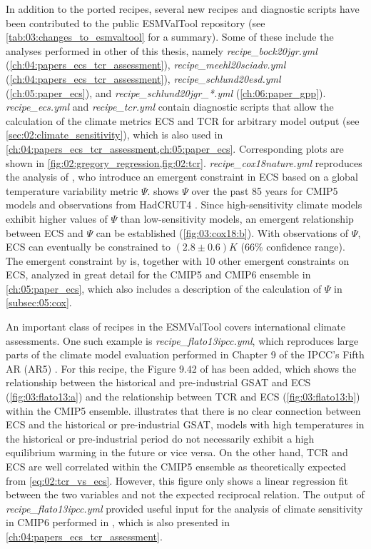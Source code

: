 In addition to the ported recipes, several new recipes and diagnostic scripts
have been contributed to the public \ac{ESMValTool} repository (see
\cref{tab:03:changes_to_esmvaltool} for a summary). Some of these include the
analyses performed in other  of
this thesis, namely \emph{recipe\_bock20jgr.yml}
(\cref{ch:04:papers_ecs_tcr_assessment}), \emph{recipe\_meehl20sciadv.yml}
(\cref{ch:04:papers_ecs_tcr_assessment}), \emph{recipe\_schlund20esd.yml}
(\cref{ch:05:paper_ecs}), and \emph{recipe\_schlund20jgr\_*.yml}
(\cref{ch:06:paper_gpp}). \emph{recipe\_ecs.yml} and \emph{recipe\_tcr.yml}
contain diagnostic scripts that allow the calculation of the climate metrics
\ac{ECS} and \ac{TCR} for arbitrary model output (see
\cref{sec:02:climate_sensitivity}), which is also used in
\cref{ch:04:papers_ecs_tcr_assessment,ch:05:paper_ecs}. Corresponding plots are
shown in \cref{fig:02:gregory_regression,fig:02:tcr}.
\emph{recipe\_cox18nature.yml} reproduces the analysis of \textcite{Cox2018},
who introduce an emergent constraint in \ac{ECS} based on a global temperature
variability metric $\Psi$.  shows $\Psi$ over the past 85
years for \acs{CMIP}5 models and observations from HadCRUT4
\autocite{Morice2012}. Since high-sensitivity climate models exhibit higher
values of $\Psi$ than low-sensitivity models, an emergent relationship between
\ac{ECS} and $\Psi$ can be established (\cref{fig:03:cox18:b}). With
observations of $\Psi$, \ac{ECS} can eventually be constrained to $\left( 2.8
\pm 0.6 \right) \unit{K}$ ($66 \unit{\%}$ confidence range). The emergent
constraint by \textcite{Cox2018} is, together with 10 other emergent
constraints on \ac{ECS}, analyzed in great detail for the \acs{CMIP}5 and
\acs{CMIP}6 ensemble in \cref{ch:05:paper_ecs}, which also includes a
description of the calculation of $\Psi$ in \cref{subsec:05:cox}.

An important class of recipes in the \ac{ESMValTool} covers international
climate assessments. One such example is \emph{recipe\_flato13ipcc.yml}, which
reproduces large parts of the climate model evaluation performed in Chapter 9
of the \ac{IPCC}'s Fifth \acl{AR} (\acs{AR}5) \autocite{Flato2013}. For this
recipe, the Figure 9.42 of \textcite{Flato2013} has been added, which shows the
relationship between the historical and pre-industrial \ac{GSAT} and \ac{ECS}
(\cref{fig:03:flato13:a}) and the relationship between \ac{TCR} and \ac{ECS}
(\cref{fig:03:flato13:b}) within the \acs{CMIP}5 ensemble.
 illustrates that there is no clear connection between
\ac{ECS} and the historical or pre-industrial \ac{GSAT}, \ie{} models with high
temperatures in the historical or pre-industrial period do not necessarily
exhibit a high equilibrium warming in the future or vice versa. On the other
hand, \ac{TCR} and \ac{ECS} are well correlated within the \acs{CMIP}5 ensemble
as theoretically expected from \cref{eq:02:tcr_vs_ecs}. However, this figure
only shows a linear regression fit between the two variables and not the
expected reciprocal relation. The output of \emph{recipe\_flato13ipcc.yml}
provided useful input for the analysis of climate sensitivity in \acs{CMIP}6
performed in \textcite{Meehl2020}, which is also presented in
\cref{ch:04:papers_ecs_tcr_assessment}.

